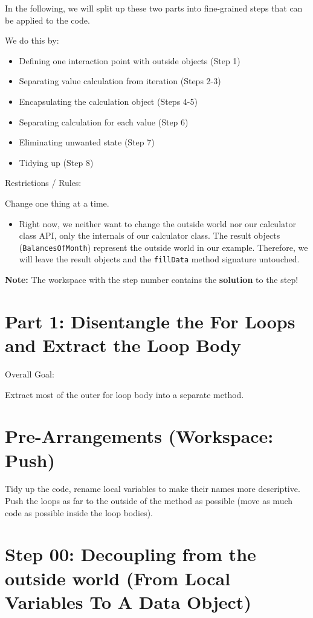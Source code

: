 \documentclass[a4paper,fleqn,titlepage,11pt]{article}
\begin{document}
In the following, we will split up these two parts into fine-grained steps that can be applied to the code.

We do this by:
\begin{itemize}
	\item Defining one interaction point with outside objects (Step 1)
	\item Separating value calculation from iteration (Steps 2-3)
	\item Encapsulating the calculation object (Steps 4-5)
	\item Separating calculation for each value (Step 6)
	\item Eliminating unwanted state (Step 7)
	\item Tidying up (Step 8)
\end{itemize}

Restrictions / Rules:

Change one thing at a time.

\begin{itemize}
\item Right now, we neither want to change the outside world nor our calculator class API, only the internals of our calculator class. The result objects (\texttt{BalancesOfMonth}) represent the outside world in our example. Therefore, we will leave the result objects and the \texttt{fillData} method signature untouched. 
\end{itemize}


\textbf{Note:} The workspace with the step number contains the \textbf{solution} to the step!

\section{Part 1: Disentangle the For Loops and Extract the Loop Body}

Overall Goal:

Extract most of the outer for loop body into a separate method.

\section{Pre-Arrangements (Workspace: Push)}

Tidy up the code, rename local variables to make their names more descriptive.
Push the loops as far to the outside of the method as possible (move as much code as possible inside the loop bodies).

\section{Step 00: Decoupling from the outside world (From Local Variables To A Data Object)}
\end{document}
